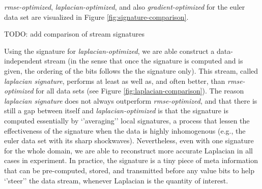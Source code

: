 \emph{rmse-optimized}, \emph{laplacian-optimized}, and also \emph{gradient-optimized} for the euler
data set are visualized in Figure \ref{fig:signature-comparison}. 

TODO: add comparison of stream signatures

Using the signature for \emph{laplacian-optimized}, we are able construct a data-independent stream
(in the sense that once the signature is computed and is given, the ordering of the bits follows the
the signature only). This stream, called \emph{laplacian signature}, performs at least as well as,
and often better, than \emph{rmse-optimized} for all data sets (see Figure
\ref{fig:laplacian-comparison}). The reason \emph{laplacian signature} does not always outperform
\emph{rmse-optimized}, and that there is still a gap between itself and \emph{laplacian-optimized}
is that the signature is computed essentially by `'averaging'' local signatures, a process that
lessen the effectiveness of the signature when the data is highly inhomogenous (e.g., the euler data
set with its sharp shockwaves). Nevertheless, even with one signature for the whole domain, we are
able to reconstruct more accurate Laplacian in all cases in experiment. In practice, the signature
is a tiny piece of meta information that can be pre-computed, stored, and transmitted before any
value bits to help `'steer'' the data stream, whenever Laplacian is the quantity of interest.
